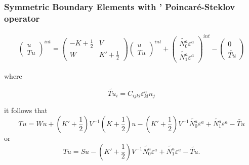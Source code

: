 \subsubsection{Symmetric Boundary Elements with ' Poincar\'e-Steklov operator}
\begin{equation}
\begin{array}{c}
\left( \begin{array}{l}
 u \\
 Tu
 \end{array}
 \right)^{int}=\left( \begin{array}{cc}
 -K+\frac{1}{2} & V \\
 W & K'+\frac{1}{2}
 \end{array}
 \right)
 \left( \begin{array}{l}
  u \\
  Tu
 \end{array}
 \right)^{int}
 +\left( \begin{array}{l}
  \widetilde{N^a_0}\varepsilon^a \\
  \widetilde{N^a_1}\varepsilon^a
 \end{array}
 \right)^{int}

-\left( \begin{array}{l}
  0 \\
\widetilde{Tu}
 \end{array}
 \right)
\end{array} \nonumber
\end{equation}

where

\begin{equation}\nonumber
\widetilde{Tu}_i=C_{ijkl}\varepsilon^a_{kl}n_j
\end{equation}



it follows that 
\begin{equation}
Tu=Wu+\left(K'+\frac{1}{2}\right)V^{-1}\left(K+\frac{1}{2}\right)u-\left(K'+\frac{1}{2}\right)V^{-1}\widetilde{N^a_0}\varepsilon^a+\widetilde{N^a_1}\varepsilon^a - \widetilde{Tu}
\end{equation}
or 
\begin{equation}\nonumber
Tu=Su-\left(K'+\frac{1}{2}\right)V^{-1}\widetilde{N^a_0}\varepsilon^a+\widetilde{N^a_1}\varepsilon^a - \widetilde{Tu}.
\end{equation}


